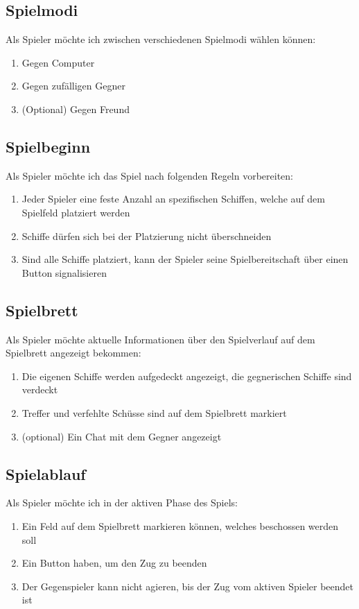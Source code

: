 \documentclass[a4paper, 10pt, conference]{IEEEtran}
\begin{document}
\subsection{Spielmodi}
Als Spieler möchte ich zwischen verschiedenen Spielmodi wählen können:
\begin{enumerate}
	\item Gegen Computer
	\item Gegen zufälligen Gegner
	\item (Optional) Gegen Freund
\end{enumerate}

\subsection{Spielbeginn}
Als Spieler möchte ich das Spiel nach folgenden Regeln vorbereiten:
\begin{enumerate}
	\item Jeder Spieler eine feste Anzahl an spezifischen Schiffen, welche auf dem Spielfeld platziert werden
	\item Schiffe dürfen sich bei der Platzierung nicht überschneiden
	\item Sind alle Schiffe platziert, kann der Spieler seine Spielbereitschaft über einen Button signalisieren
\end{enumerate}

\subsection{Spielbrett}
Als Spieler möchte aktuelle Informationen über den Spielverlauf auf dem Spielbrett angezeigt bekommen:
\begin{enumerate}
	\item Die eigenen Schiffe werden aufgedeckt angezeigt, die gegnerischen Schiffe sind verdeckt
	\item Treffer und verfehlte Schüsse sind auf dem Spielbrett markiert
	\item (optional) Ein Chat mit dem Gegner angezeigt
\end{enumerate}

\subsection{Spielablauf}
Als Spieler möchte ich in der aktiven Phase des Spiels:
\begin{enumerate}
	\item Ein Feld auf dem Spielbrett markieren können, welches beschossen werden soll
	\item Ein Button haben, um den Zug zu beenden
	\item Der Gegenspieler kann nicht agieren, bis der Zug vom aktiven Spieler beendet ist
\end{enumerate}
\end{document}
